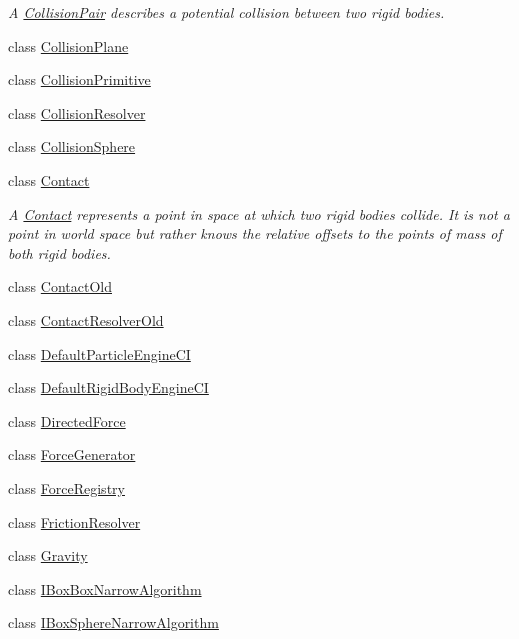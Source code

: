 \begin{DoxyCompactItemize}
\begin{DoxyCompactList}\small\item\em A \mbox{\hyperlink{classr3_1_1_collision_pair}{Collision\+Pair}} describes a potential collision between two rigid bodies. \end{DoxyCompactList}\item 
class \mbox{\hyperlink{classr3_1_1_collision_plane}{Collision\+Plane}}
\item 
class \mbox{\hyperlink{classr3_1_1_collision_primitive}{Collision\+Primitive}}
\item 
class \mbox{\hyperlink{classr3_1_1_collision_resolver}{Collision\+Resolver}}
\item 
class \mbox{\hyperlink{classr3_1_1_collision_sphere}{Collision\+Sphere}}
\item 
class \mbox{\hyperlink{classr3_1_1_contact}{Contact}}
\begin{DoxyCompactList}\small\item\em A \mbox{\hyperlink{classr3_1_1_contact}{Contact}} represents a point in space at which two rigid bodies collide. It is not a point in world space but rather knows the relative offsets to the points of mass of both rigid bodies. \end{DoxyCompactList}\item 
class \mbox{\hyperlink{classr3_1_1_contact_old}{Contact\+Old}}
\item 
class \mbox{\hyperlink{classr3_1_1_contact_resolver_old}{Contact\+Resolver\+Old}}
\item 
class \mbox{\hyperlink{classr3_1_1_default_particle_engine_c_i}{Default\+Particle\+Engine\+CI}}
\item 
class \mbox{\hyperlink{classr3_1_1_default_rigid_body_engine_c_i}{Default\+Rigid\+Body\+Engine\+CI}}
\item 
class \mbox{\hyperlink{classr3_1_1_directed_force}{Directed\+Force}}
\item 
class \mbox{\hyperlink{classr3_1_1_force_generator}{Force\+Generator}}
\item 
class \mbox{\hyperlink{classr3_1_1_force_registry}{Force\+Registry}}
\item 
class \mbox{\hyperlink{classr3_1_1_friction_resolver}{Friction\+Resolver}}
\item 
class \mbox{\hyperlink{classr3_1_1_gravity}{Gravity}}
\item 
class \mbox{\hyperlink{classr3_1_1_i_box_box_narrow_algorithm}{I\+Box\+Box\+Narrow\+Algorithm}}
\item 
class \mbox{\hyperlink{classr3_1_1_i_box_sphere_narrow_algorithm}{I\+Box\+Sphere\+Narrow\+Algorithm}}

\end{DoxyCompactItemize}
